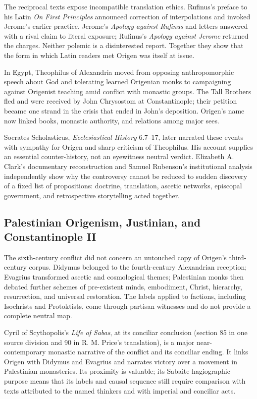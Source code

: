 The reciprocal texts expose incompatible translation ethics. Rufinus's preface
to his Latin \emph{On First Principles} announced correction of interpolations
and invoked Jerome's earlier practice. Jerome's \emph{Apology against Rufinus}
and letters answered with a rival claim to literal exposure; Rufinus's
\emph{Apology against Jerome} returned the charges. Neither polemic is a
disinterested report. Together they show that the form in which Latin readers
met Origen was itself at issue.

In Egypt, Theophilus of Alexandria moved from opposing anthropomorphic speech
about God and tolerating learned Origenian monks to campaigning against
Origenist teaching amid conflict with monastic groups. The Tall Brothers fled
and were received by John Chrysostom at Constantinople; their petition became
one strand in the crisis that ended in John's deposition. Origen's name now
linked books, monastic authority, and relations among major sees.

Socrates Scholasticus, \emph{Ecclesiastical History} 6.7--17, later narrated
these events with sympathy for Origen and sharp criticism of Theophilus. His
account supplies an essential counter-history, not an eyewitness neutral
verdict. Elizabeth A. Clark's documentary reconstruction and Samuel Rubenson's
institutional analysis independently show why the controversy cannot be reduced
to sudden discovery of a fixed list of propositions: doctrine, translation,
ascetic networks, episcopal government, and retrospective storytelling acted
together.

\subsection{Palestinian Origenism, Justinian, and Constantinople II}

The sixth-century conflict did not concern an untouched copy of Origen's
third-century corpus. Didymus belonged to the fourth-century Alexandrian reception;
Evagrius transformed ascetic and cosmological themes; Palestinian monks then
debated further schemes of pre-existent minds, embodiment, Christ, hierarchy,
resurrection, and universal restoration. The labels applied to factions,
including Isochrists and Protoktists, come through partisan witnesses and do
not provide a complete neutral map.

Cyril of Scythopolis's \emph{Life of Sabas}, at its conciliar conclusion
(section 85 in one source division and 90 in R. M. Price's translation), is a major
near-contemporary monastic narrative of the conflict and its conciliar ending.
It links Origen with Didymus and Evagrius and narrates victory over a movement
in Palestinian monasteries. Its proximity is valuable; its Sabaite hagiographic
purpose means that its labels and causal sequence still require comparison
with texts attributed to the named thinkers and with imperial and conciliar
acts.

